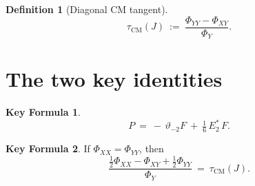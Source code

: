 \documentclass[11pt]{article}
\newcommand{\tcm}{\tau_{\mathrm{CM}}}
\theoremstyle{definition}
\newtheorem{defn}{Definition}
\newtheorem{keyformula}{Key Formula}
\begin{document}
\begin{defn}[Diagonal CM tangent]
\[
\tcm(J)\ :=\ \frac{\Phi_{YY}-\Phi_{XY}}{\Phi_Y}.
\]
\end{defn}

\section*{The two key identities}

\begin{keyformula}\label{Formula1}
\[
P\ =\ -\,\vartheta_{-2}F\ +\ \tfrac16\,E_2^{*}\,F.
\]
\end{keyformula}

\begin{keyformula}\label{Formula2}
If $\Phi_{XX}=\Phi_{YY}$, then
\[
\frac{\tfrac12\Phi_{XX}-\Phi_{XY}+\tfrac12\Phi_{YY}}{\Phi_Y}
\ =\ \tcm(J).
\]
\end{keyformula}
\end{document}

